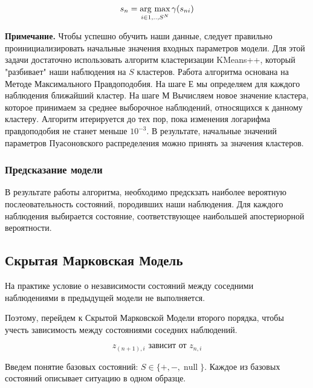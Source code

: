 \documentclass{matmex-diploma}
\begin{document}
$$s_n = \mathop{\rm arg~max}\limits_{i \in {1,..,S}^N} {\gamma (s_{ni})} $$

\textbf{Примечание.} Чтобы успешно обучить наши данные, следует правильно проинициализировать начальные значения входных параметров модели. Для этой задачи достаточно использовать алгоритм кластеризации KMeans++\cite{book:murphy}, который "разбивает" наши наблюдения на $S$ кластеров. Работа алгоритма основана на Методе Максимального Правдоподобия. На шаге Е мы определяем для каждого наблюдения ближайший кластер. На шаге М Вычисляем новое значение кластера, которое принимаем за среднее выборочное наблюдений, относящихся к данному кластеру. Алгоритм итерируется до тех пор, пока изменения логарифма правдоподобия не станет меньше $10^{-3}$. В результате, начальные значений параметров Пуасоновского распределения можно принять за значения кластеров.

\subsubsection{Предсказание модели}

В результате работы алгоритма, необходимо предскзать наиболее вероятную послеовательность состояний, породивших наши наблюдения.
Для каждого наблюдения выбирается состояние, соответствующее наибольшей апостериорной вероятности.

\subsection{Скрытая Марковская Модель}

На практике условие о независимости  состояний между соседними наблюдениями в предыдущей модели не выполняется.

Поэтому, перейдем к Скрытой Марковской Модели второго порядка, чтобы учесть зависимость между состояниями соседних наблюдений.

\[
z_{(n+1),i} \mbox{ зависит от } z_{n,i}
\]

Введем понятие базовых состояний: $ S \in \{+, -, \operatorname{null}\}$.
Каждое из базовых состояний описывает ситуацию в одном образце. 
\end{document}
